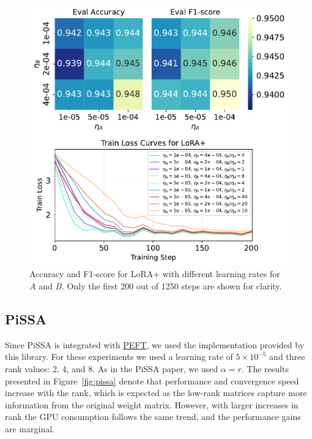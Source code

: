 \documentclass[a4paper,10pt,twocolumn,english]{article}
\begin{document}
\begin{figure}[ht]
    \centering
    \includegraphics[width=1\linewidth]{../plots/lora_plus_train_loss_curves_final_v2.pdf}
    \caption{Accuracy and F1-score for LoRA+ with different learning rates for $A$ and $B$. Only the first 200 out of 1250 steps are shown for clarity.}
    \label{fig:lora_plus}
\end{figure}

\subsection{PiSSA}

Since PiSSA is integrated with \href{https://github.com/huggingface/peft}{PEFT}, we used the implementation provided by this library. For these experiments we used a learning rate of $5 \times 10^{-5}$ and three rank values: 2, 4, and 8. As in the PiSSA paper, we used $\alpha = r$. The results presented in Figure~\ref{fig:pissa} denote that performance and convergence speed increase with the rank, which is expected as the low-rank matrices capture more information from the original weight matrix. However, with larger increases in rank the GPU consumption follows the same trend, and the performance gains are marginal.
\end{document}
